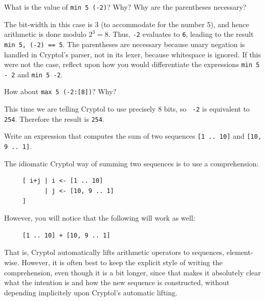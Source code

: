 \begin{Exercise}\label{ex:arith:5}
  What is the value of {\tt min 5 (-2)}?  Why?  Why are the
  parentheses necessary?\indMin\indModular\indUnaryMinus
\end{Exercise}
\begin{Answer}
  The bit-width in this case is 3 (to accommodate for the number 5),
  and hence arithmetic is done modulo $2^3 = 8$. Thus, {\tt -2}
  evaluates to {\tt 6}, leading to the result {\tt min 5, (-2) == 5}.
  The parentheses are necessary because unary negation is handled in
  Cryptol's parser, not in its lexer, because whitespace is ignored.
  If this were not the case, reflect upon how you would differentiate
  the expressions \texttt{min 5 - 2} and \texttt{min 5 -2}.
\end{Answer}

\begin{Exercise}\label{ex:arith:6}
How about {\tt max 5 (-2:[8])}? Why?\indMin\indModular\indUnaryMinus
\end{Exercise}
\begin{Answer}
  This time we are telling Cryptol to use precisely 8 bits, so {\tt
    -2} is equivalent to {\tt 254}. Therefore the result is {\tt 254}.
\end{Answer}

\begin{Exercise}\label{ex:arith:7}
  Write an expression that computes the sum of two sequences {\tt [1
    .. 10]} and {\tt [10, 9 .. 1]}.\indPlus
\end{Exercise}
\begin{Answer}
  The idiomatic Cryptol way of summing two sequences is to use a
  comprehension:\indComp
\begin{Verbatim}
     [ i+j | i <- [1 .. 10]
           | j <- [10, 9 .. 1]
     ]
\end{Verbatim}
However, you will notice that the following will work as well:
\begin{Verbatim}
     [1 .. 10] + [10, 9 .. 1]
\end{Verbatim}
That is, Cryptol automatically lifts arithmetic operators to
sequences, element-wise. However, it is often best to keep the
explicit style of writing the comprehension, even though it is a bit
longer, since that makes it absolutely clear what the intention is and
how the new sequence is constructed, without depending implicitely
upon Cryptol's automatic lifting.\indArithLift
\end{Answer}

